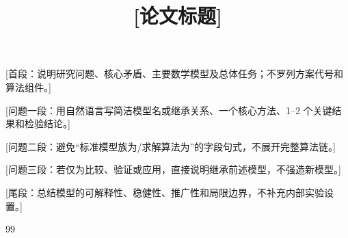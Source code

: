\documentclass[withoutpreface,bwprint]{cumcmthesis}
\title{[论文标题]}
\makeatletter
\renewenvironment{abstract}{%
  \if@twocolumn\section*{\abstractname}%
  \else\begin{center}{\zihao{4}\bfseries \abstractname\vspace{-.5em}\vspace{\z@}}\end{center}\quotation\fi
}{\if@twocolumn\else\endquotation\newpage\fi}
\makeatother
\begin{document}
\maketitle
\begin{abstract}
\label{AbstractStart}
[首段：说明研究问题、核心矛盾、主要数学模型及总体任务；不罗列方案代号和算法组件。]

[问题一段：用自然语言写简洁模型名或继承关系、一个核心方法、1--2 个关键结果和检验结论。]

[问题二段：避免“标准模型族为/求解算法为”的字段句式，不展开完整算法链。]

[问题三段：若仅为比较、验证或应用，直接说明继承前述模型，不强造新模型。]

[尾段：总结模型的可解释性、稳健性、推广性和局限边界，不补充内部实验设置。]
\keywords{[主要数学模型族1]\quad [主要数学模型族2]\quad [核心算法1]\quad [核心算法2]}
\label{AbstractEnd}
\end{abstract}
\label{BodyStart}









\begin{thebibliography}{99}
\end{thebibliography}
\label{BodyEnd}
\begin{appendices}

\end{appendices}
\end{document}
